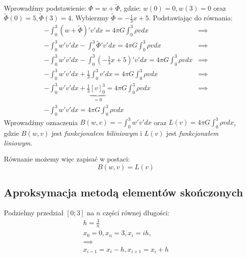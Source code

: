 \documentclass[11pt,a4paper]{article}
\begin{document}
Wprowadźmy podstawienie: $\Phi = w + \widetilde{\Phi}$, gdzie:
$w(0) = 0, w(3) = 0$ oraz $\widetilde{\Phi}(0) = 5, \widetilde{\Phi}(3) = 4$.
Wybierzmy $\widetilde{\Phi} = -\frac{1}{3}x + 5$.
Podstawiając do równania:
\begin{equation}
    \begin{split}
        -\int_{0}^{3} (w + \widetilde{\Phi})'v'dx = 4\pi G \int_{0}^{3}\rho v dx
        &\implies
        \\
        -\int_{0}^{3}w'v'dx - \int_{0}^{3}\widetilde{\Phi}'v'dx = 4\pi G \int_{0}^{3}\rho v dx
        &\implies
        \\
        -\int_{0}^{3}w'v'dx - \int_{0}^{3}(-\frac{1}{3}x + 5)'v'dx = 4\pi G \int_{0}^{3}\rho v dx
        &\implies
        \\
        -\int_{0}^{3}w'v'dx + \frac{1}{3} \int_{0}^{3}v'dx = 4\pi G \int_{0}^{3}\rho v dx
        &\implies
        \\
        -\int_{0}^{3}w'v'dx + \frac{1}{3} \underbrace{[v]^3_0}_{=0} = 4\pi G \int_{0}^{3}\rho v dx
        &\implies
        \\
        -\int_{0}^{3}w'v'dx = 4\pi G \int_{0}^{3}\rho v dx
    \end{split}
\end{equation}
Wprowadźmy oznaczenia $B(w, v) = -\int_{0}^{3}w'v'dx$ oraz
$L(v) = 4\pi G \int_{0}^{3}\rho v dx$, gdzie $B(w, v)$ jest
\textit{funkcjonałem biliniowym} i $L(v)$ 
jest \textit{funkcjonałem liniowym}.

Równanie możemy więc zapisać w postaci:
\begin{equation}
    B(w, v) = L(v)
\end{equation}

\subsection{Aproksymacja metodą elementów skończonych}
Podzielmy przedział $[0; 3]$ na $n$ części równej długości:
\begin{equation}
    \begin{split}
        h = \frac{3}{n}
        \\
        x_0 = 0, x_n = 3,  x_i = ih, 
        \\
        \implies
        \\
        x_{i - 1} = x_i - h, x_{i + 1} = x_i + h 
    \end{split}
\end{equation}
\end{document}
